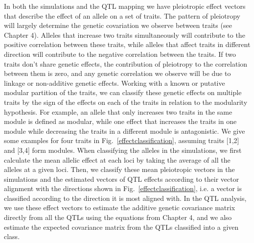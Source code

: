 \begin{refsection}
In both the simulations and the QTL mapping we have pleiotropic effect vectors
that describe the effect of an allele on a set of traits. The pattern of
pleiotropy will largely determine the genetic covariation we observe between
traits (see Chapter 4). Alleles that increase two traits simultaneously will
contribute to the positive correlation between these traits, while alleles
that affect traits in different direction will contribute to the negative
correlation between the traits. If two traits don't share genetic effects, the
contribution of pleiotropy to the correlation between them is zero, and any
genetic correlation we observe will be due to linkage or non-additive genetic
effects. Working with a known or putative modular partition of the traits, we
can classify these genetic effects on multiple traits by the sign of the
effects on each of the traits in relation to the modularity hypothesis. For
example, an allele that only increases two traits in the same module is
defined as modular, while one effect that increases the traits in one module
while decreasing the traits in a different module is antagonistic.  We give
some examples for four traits in Fig.~\ref{effectclassification}, assuming
traits [1,2] and [3,4] form modules. When classifying the alleles in the
simulations, we first calculate the mean allelic effect at each loci by taking
the average of all the alleles at a given loci. Then, we classify these mean
pleiotropic vectors in the simulations and the estimated vectors of QTL
effects according to their vector alignment with the directions shown in
Fig.~\ref{effectclassification}, i.e. a vector is classified according to the
direction it is most aligned with. In the QTL analysis,  we use these effect
vectors to estimate the additive genetic  covariance matrix directly from all
the QTLs using the equations from Chapter 4, and we also estimate the expected
covariance matrix from the QTLs classified into a given class.



\end{refsection}
